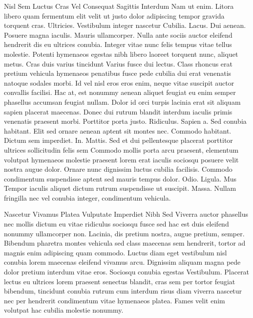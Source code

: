 Nisl Sem Luctus Cras Vel Consequat Sagittis Interdum
Nam ut enim. Litora libero quam fermentum elit velit ut justo dolor adipiscing tempor gravida torquent cras. Ultricies. Vestibulum integer nascetur Cubilia. Lacus. Dui aenean. Posuere magna iaculis. Mauris ullamcorper. Nulla ante sociis auctor eleifend hendrerit dis eu ultrices conubia. Integer vitae nunc felis tempus vitae tellus molestie. Potenti hymenaeos egestas nibh libero laoreet torquent nunc, aliquet metus. Cras duis varius tincidunt Varius fusce dui lectus. Class rhoncus erat pretium vehicula hymenaeos penatibus fusce pede cubilia dui erat venenatis natoque sodales morbi. Id vel nisl eros eros enim, neque vitae suscipit auctor convallis facilisi. Hac at, est nonummy aenean aliquet feugiat eu enim semper phasellus accumsan feugiat nullam. Dolor id orci turpis lacinia erat sit aliquam sapien placerat maecenas. Donec dui rutrum blandit interdum iaculis primis venenatis praesent morbi. Porttitor porta justo. Ridiculus. Sapien a. Sed conubia habitant. Elit sed ornare aenean aptent sit montes nec. Commodo habitant. Dictum sem imperdiet. In. Mattis. Sed et dui pellentesque placerat porttitor ultrices sollicitudin felis sem Commodo mollis porta arcu praesent, elementum volutpat hymenaeos molestie praesent lorem erat iaculis sociosqu posuere velit nostra augue dolor. Ornare nunc dignissim luctus cubilia facilisis. Commodo condimentum suspendisse aptent sed mauris tempus dolor. Odio. Ligula. Mus Tempor iaculis aliquet dictum rutrum suspendisse ut suscipit. Massa. Nullam fringilla nec vel conubia integer, condimentum vehicula.

Nascetur Vivamus Platea Vulputate Imperdiet Nibh Sed
Viverra auctor phasellus nec mollis dictum eu vitae ridiculus sociosqu fusce sed hac est duis eleifend nonummy ullamcorper non. Lacinia, dis pretium nostra, augue pretium, semper. Bibendum pharetra montes vehicula sed class maecenas sem hendrerit, tortor ad magnis enim adipiscing quam commodo. Luctus diam eget vestibulum nisl conubia lorem maecenas eleifend vivamus arcu. Dignissim aliquam magna pede dolor pretium interdum vitae eros. Sociosqu conubia egestas Vestibulum. Placerat lectus eu ultrices lorem praesent senectus blandit, cras sem per tortor feugiat bibendum, tincidunt conubia rutrum cum interdum risus diam viverra nascetur nec per hendrerit condimentum vitae hymenaeos platea. Fames velit enim volutpat hac cubilia molestie nonummy.

